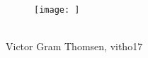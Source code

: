 \documentclass[../main.tex]{subfiles}
\begin{document}
\begin{minipage}{1\textwidth}
\begin{center}
\vskip 0.2in

\begin{minipage}{0.5\textwidth}
\begin{flushleft} \footnotesize
\begin{center}
\begin{figure}[H]
 \centering
  \texttt{[image: ]}
   \end{figure}
\underline{\hspace{6cm}}\\
Victor Gram Thomsen, vitho17\\
\end{center}
\end{flushleft}
\end{minipage}%


\end{center}
\end{minipage}



\newpage
\end{document}
